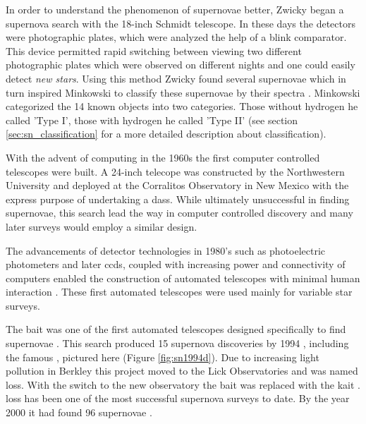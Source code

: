 In order to understand the phenomenon of supernovae better, Zwicky began a supernova search with the 18-inch Schmidt telescope. In these days the detectors were photographic plates, which were analyzed the help of  a blink comparator. This device permitted rapid switching between viewing two different photographic plates which were observed on different nights and one could easily detect \textit{new stars}. Using this method Zwicky found several supernovae which in turn inspired Minkowski to classify these supernovae by their spectra \citet{1941PASP...53..224M}. 
Minkowski categorized the 14 known objects into two categories. Those without hydrogen he called 'Type I', those with hydrogen he called 'Type II' (see section \ref{sec:sn_classification} for a more detailed description about classification).

With the advent of computing in the 1960s the first computer controlled telescopes were built. A 24-inch telecope was constructed by the Northwestern University and deployed at the Corralitos Observatory in New Mexico \citep{1975PASP...87..565C} with the express purpose of undertaking a \gls{dass}. While ultimately unsuccessful in finding supernovae, this search lead the way in computer controlled discovery and many later surveys would employ a similar design.

The advancements of detector technologies in 1980's such as photoelectric photometers and later \glspl{ccd}, coupled with increasing power and connectivity of computers enabled the construction of automated telescopes with minimal human interaction \citep[e.g.][]{1986IAUS..118...47G}. These first automated telescopes were used mainly for variable star surveys. 

The \gls{bait} was one of the first automated telescopes designed specifically to find supernovae \citep{1993PASP..105.1164R}. This search produced 15 supernova discoveries by 1994 \citep{1994AAS...185.7905V}, including the famous , pictured here (Figure \ref{fig:sn1994d}). Due to increasing light pollution in Berkley this project moved to the Lick Observatories and was named \gls{loss}. With the switch to the new observatory the \gls{bait} was replaced with the \gls{kait} \citep{2001ASPC..246..121F}. \gls{loss} has been one of the most successful supernova surveys to date. By the year 2000 it had found 96 supernovae \citep{2001ASPC..246..121F}. 

